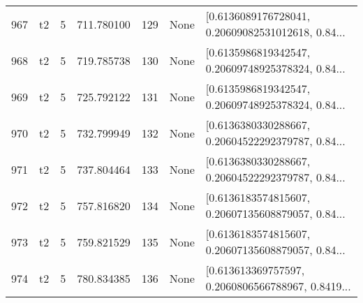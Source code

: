 \begin{tabular}{lllrlll}
967 &  t2 &   5 &   711.780100 &  129 &  None &  [0.6136089176728041, 0.20609082531012618, 0.84... \\
968 &  t2 &   5 &   719.785738 &  130 &  None &  [0.6135986819342547, 0.20609748925378324, 0.84... \\
969 &  t2 &   5 &   725.792122 &  131 &  None &  [0.6135986819342547, 0.20609748925378324, 0.84... \\
970 &  t2 &   5 &   732.799949 &  132 &  None &  [0.6136380330288667, 0.20604522292379787, 0.84... \\
971 &  t2 &   5 &   737.804464 &  133 &  None &  [0.6136380330288667, 0.20604522292379787, 0.84... \\
972 &  t2 &   5 &   757.816820 &  134 &  None &  [0.6136183574815607, 0.20607135608879057, 0.84... \\
973 &  t2 &   5 &   759.821529 &  135 &  None &  [0.6136183574815607, 0.20607135608879057, 0.84... \\
974 &  t2 &   5 &   780.834385 &  136 &  None &  [0.613613369757597, 0.2060806566788967, 0.8419... \\
\bottomrule
\end{tabular}
